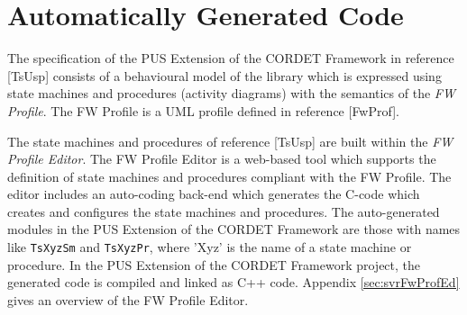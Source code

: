 \documentclass{pnp_article}
\begin{document}

\section{Automatically Generated Code}\label{sec:svrAutoCode}
The specification of the PUS Extension of the CORDET Framework in reference [TsUsp] consists of a behavioural model of the library which is expressed using state machines and procedures (activity diagrams) with the semantics of the \textit{FW Profile}. The FW Profile is a UML profile defined in reference [FwProf]. 

The state machines and procedures of reference [TsUsp] are built within the \textit{FW Profile Editor}. The FW Profile Editor is a web-based tool which supports the definition of state machines and procedures compliant with the FW Profile. The editor includes an auto-coding back-end which generates the C-code which creates and configures the state machines and procedures. The auto-generated modules in the PUS Extension of the CORDET Framework are those with names like \texttt{TsXyzSm} and \texttt{TsXyzPr}, where 'Xyz' is the name of a state machine or procedure. In the PUS Extension of the CORDET Framework project, the generated code is compiled and linked as C++ code. Appendix \ref{sec:svrFwProfEd} gives an overview of the FW Profile Editor.
\end{document}
